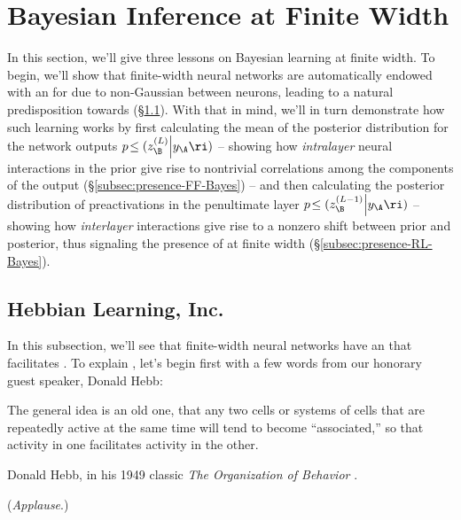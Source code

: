 \section{Bayesian Inference at Finite Width}\label{sec:finite-posterior}
In this section, we'll give three lessons on Bayesian learning at finite width. 
To begin, we'll show that finite-width neural networks are automatically endowed with an  for  due to non-Gaussian  between neurons,
leading to a natural predisposition towards  (\S\ref{subsec:Hebbian}).
With that in mind, we'll in turn demonstrate how such learning works by first
calculating the mean of the posterior distribution for the network outputs  $p\!\le(z_{\B}^{(L)}\Big\vert y_{\A} \ri)$ -- showing how  \emph{intralayer} neural interactions in the prior give rise to nontrivial correlations among the components of the output (\S\ref{subsec:presence-FF-Bayes}) -- and then
calculating the posterior distribution of preactivations in the penultimate layer $p\!\le(z_{\B}^{(L-1)}\Big\vert y_{\A}\ri)$ 
-- showing how \emph{interlayer} interactions
give rise to a nonzero shift between prior and posterior, thus signaling the presence of  at finite width (\S\ref{subsec:presence-RL-Bayes}).









\subsection{Hebbian Learning, Inc.}\label{subsec:Hebbian}
In this subsection, we'll see that finite-width neural networks have an  that facilitates .
To explain , let's begin first with a few words from our
honorary
guest speaker, Donald Hebb:

\epigraph{The general idea is an old one, that any two cells or systems of cells that are repeatedly active at the same time will tend to become ``associated,'' so that activity in one facilitates activity in the other.}{Donald Hebb, in his 1949 classic \emph{The Organization of Behavior} \cite{hebb2005organization}.}

\noindent{}(\emph{Applause}.) 

